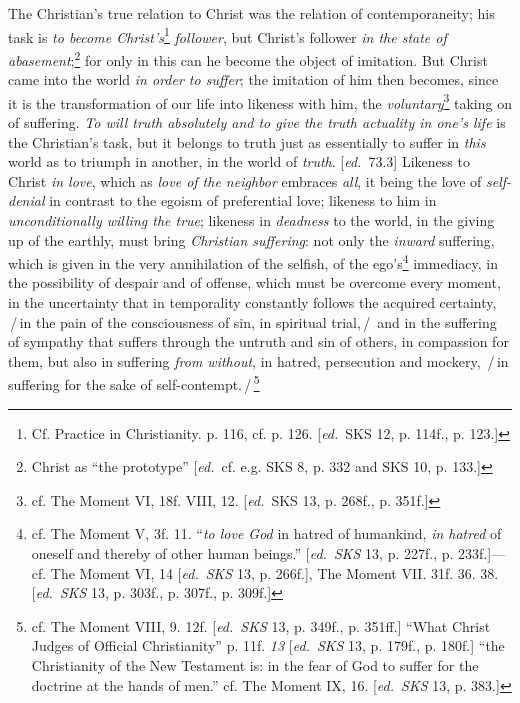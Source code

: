 \documentclass[12pt,a4paper,openany]{book}
\newcommand{\kpage}[1]{\marginnote{\footnotesize\textit{[#1]}}}
\newcommand{\ed}[1]{{\small[\textit{ed.}\ #1]}}
\newcommand{\ins}[1]{\,/\,#1\,/\,}
\begin{document}
The Christian's true relation to Christ was the relation of
contemporaneity; his task is \emph{to become Christ's}\footnote[91]{Cf. Practice in Christianity. p. 116, cf. p. 126. \ed{SKS 12, p. 114f., p. 123.}}
\emph{follower}, but Christ's follower
\emph{in the state of abasement};\footnote[92]{Christ as ``the prototype'' \ed{cf. e.g. SKS 8, p. 332 and SKS 10, p. 133.}}
for only in this can he become
the object of imitation. But Christ came into the world \emph{in order to suffer};
the imitation of him then becomes, since it is the transformation of our life into
likeness with him, the \emph{voluntary}\footnote[93]{cf. The Moment VI, 18f. VIII, 12. \ed{SKS 13, p. 268f., p. 351f.}}
taking on of suffering. \emph{To will truth
absolutely and to give the truth actuality in one's life} is the Christian's task,
but it belongs to truth just as essentially to suffer in \emph{this}
world as to triumph in another, in the world of \emph{truth}. \ed{73.3} Likeness
to Christ \emph{in love}, which as \emph{love of the neighbor} embraces \emph{all},
it being the love of \emph{self-denial} in contrast to the egoism of preferential
love; likeness to him in \emph{unconditionally willing the true}; likeness
in \emph{deadness} to the world, in the giving up of the earthly, must bring
\emph{Christian suffering}: not only the \emph{inward} suffering, which is given in the very annihilation
of the selfish, of the ego's\footnote[94]{cf. The Moment V, 3f. 11. ``\emph{to love God} in hatred of humankind, \emph{in hatred} of oneself and thereby
of other human beings.'' \ed{\emph{SKS} 13, p. 227f., p. 233f.}--- cf. The Moment VI, 14 \ed{\emph{SKS} 13, p.
266f.}, The Moment VII. 31f. 36. 38. \ed{\emph{SKS} 13, p. 303f., p. 307f., p. 309f.}}
immediacy, in the possibility of despair
and of offense, which must be overcome every moment, in
the uncertainty that in temporality constantly follows the acquired
\kpage{155}certainty, \ins{in the pain of the consciousness of sin, in spiritual trial,} and in the
suffering of sympathy that suffers through the untruth and
sin of others, in compassion for them, but also in suffering \emph{from without}, in hatred,
persecution and mockery, \ins{in suffering for the sake of self-contempt.}\footnote[95]{cf. The Moment VIII, 9. 12f. \ed{\emph{SKS} 13, p. 349f., p. 351ff.} ``What Christ Judges
of Official Christianity'' p. 11f. \emph{13} \ed{\emph{SKS} 13, p. 179f., p. 180f.} ``the Christianity of the New
Testament is: in the fear of God to suffer for the doctrine at the hands of men.'' cf. The Moment IX,
16. \ed{\emph{SKS} 13, p. 383.}}
\end{document}
